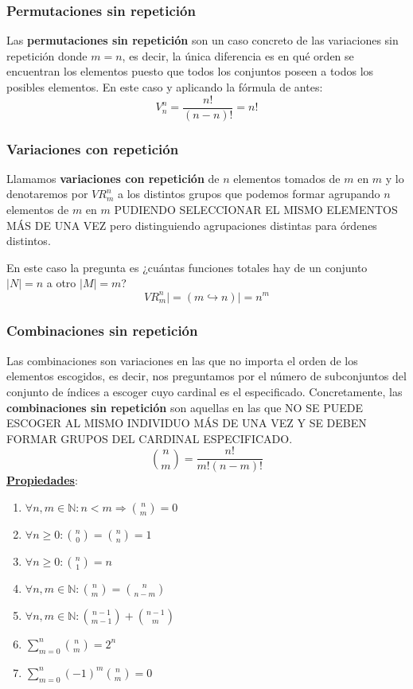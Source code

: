 \documentclass[10pt,a4paper,openright]{book}
\begin{document}
\subsubsection*{Permutaciones sin repetición}
Las \textbf{permutaciones sin repetición} son un caso concreto de las variaciones sin repetición donde $m=n$, es decir, la única diferencia es en qué orden se encuentran los elementos puesto que todos los conjuntos poseen a todos los posibles elementos. En este caso y aplicando la fórmula de antes:
$$V_n^n=\frac{n!}{(n-n)!}=n!$$

\subsubsection*{Variaciones con repetición}
Llamamos \textbf{variaciones con repetición} de $n$ elementos tomados de $m$ en $m$ y lo denotaremos por $VR_m^n$ a los distintos grupos que podemos formar agrupando $n$ elementos de $m$ en $m$ PUDIENDO SELECCIONAR EL MISMO ELEMENTOS MÁS DE UNA VEZ pero distinguiendo agrupaciones distintas para órdenes distintos.

En este caso la pregunta es ¿cuántas funciones totales hay de un conjunto $|N|=n$ a otro $|M|=m$?
$$VR_m^n|=(m\hookrightarrow n)|= n^m$$

\subsubsection*{Combinaciones sin repetición}
Las combinaciones son variaciones en las que no importa el orden de los elementos escogidos, es decir, nos preguntamos por el número de subconjuntos del conjunto de índices a escoger cuyo cardinal es el especificado. Concretamente, las \textbf{combinaciones sin repetición} son aquellas en las que NO SE PUEDE ESCOGER AL MISMO INDIVIDUO MÁS DE UNA VEZ Y SE DEBEN FORMAR GRUPOS DEL CARDINAL ESPECIFICADO.
$$\binom{n}{m}=\frac{n!}{m!(n-m)!}$$
\underline{\textbf{Propiedades}}:
\begin{enumerate}
\item $\forall n,m \in \mathbb N : n<m\Rightarrow \binom{n}{m} = 0$
\item $\forall n \geq 0: \binom{n}{0} = \binom{n}{n} = 1$
\item $\forall n\geq 0 : \binom{n}{1}= n$
\item $\forall n,m\in \mathbb N: \binom{n}{m} = \binom{n}{n-m}$
\item $\forall n,m\in \mathbb N: \binom{n-1}{m-1} +\binom{n-1}{m}$
\item $\sum_{m = 0}^{n}\binom{n}{m} = 2^n$
\item $\sum_{m = 0}^{n}(-1)^m\binom{n}{m} = 0$
\end{enumerate}
\end{document}
